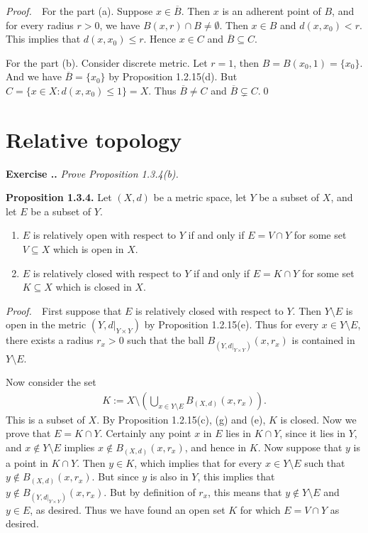 \documentclass{book}
\newcommand{\pff}{\vspace{.25em}\noindent\emph{Proof.}~~}
\newcommand{\titl}[1]{\noindent\textbf{#1}}
\newcounter{Exercise}[section]
\renewcommand{\theExercise}{\thesection.\arabic{Exercise}.}
\newcommand{\new}{\vspace{1.5em}\noindent\textbf{Exercise \stepcounter{Exercise}\textbf{\theExercise}} }
\begin{document}
\pff For the part (a). Suppose $x\in\overline B$. Then $x$ is an adherent point of $B$, and for every radius $r>0$, we have $B(x,r)\cap B\neq\emptyset$. Then $x\in B$ and $d(x,x_0)<r$. This implies that $d(x,x_0)\leq r$. Hence $x\in C$ and $\overline B\subseteq C$.

For the part (b). Consider discrete metric. Let $r=1$, then $B=B(x_0,1)=\{x_0\}$. And we have $\overline B=\{x_0\}$ by Proposition 1.2.15(d). But $C=\{x\in X:d(x,x_0)\leq 1\}=X$. Thus $\overline B\neq C$ and $\overline B\subsetneq C$.\qed

\section{Relative topology}

\new\emph{Prove Proposition 1.3.4(b).}

\begin{framed}
    \titl{Proposition 1.3.4.} Let $(X,d)$ be a metric space, let $Y$ be a subset of $X$, and let $E$ be a subset of $Y$.
        \begin{enumerate}
            \item $E$ is relatively open with respect to $Y$ if and only if $E=V\cap Y$ for some set $V\subseteq X$ which is open in $X$.
            \item $E$ is relatively closed with respect to $Y$ if and only if $E=K\cap Y$ for some set $K\subseteq X$ which is closed in $X$.
        \end{enumerate}
\end{framed}

\pff First suppose that $E$ is relatively closed with respect to $Y$. Then $Y\setminus E$ is open in the metric $(Y,d|_{Y\times Y})$ by Proposition 1.2.15(e). Thus for every $x\in Y\setminus E$, there exists a radius $r_x>0$ such that the ball $B_{(Y,d|_{Y\times Y})}(x,r_x)$ is contained in $Y\setminus E$.

Now consider the set
    \begin{align*}
        K:=X\setminus\left(\bigcup_{x\in Y\setminus E}B_{(X,d)}(x,r_x)\right).
    \end{align*}
This is a subset of $X$. By Proposition 1.2.15(c), (g) and (e), $K$ is closed. Now we prove that $E=K\cap Y$. Certainly any point $x$ in $E$ lies in $K\cap Y$, since it lies in $Y$, and $x\notin Y\setminus E$ implies $x\notin B_{(X,d)}(x,r_x)$, and hence in $K$. Now suppose that $y$ is a point in $K\cap Y$. Then $y\in K$, which implies that for every $x\in Y\setminus E$ such that $y\notin B_{(X,d)}(x,r_x)$. But since $y$ is also in $Y$, this implies that $y\notin B_{(Y,d|_{Y\times Y})}(x,r_x)$. But by definition of $r_x$, this means that $y\notin Y\setminus E$ and $y\in E$, as desired. Thus we have found an open set $K$ for which $E=V\cap Y$ as desired.
\end{document}
